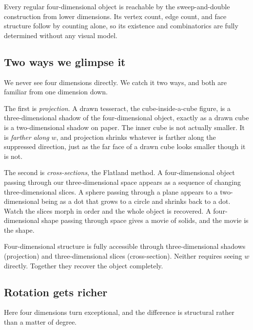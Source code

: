 \begin{proposition}
Every regular four-dimensional object is reachable by the sweep-and-double construction from lower dimensions. Its vertex count, edge count, and face structure follow by counting alone, so its existence and combinatorics are fully determined without any visual model.
\end{proposition}

\subsection{Two ways we glimpse it}

We never see four dimensions directly. We catch it two ways, and both are familiar from one dimension down.

The first is \emph{projection}. A drawn tesseract, the cube-inside-a-cube figure, is a three-dimensional shadow of the four-dimensional object, exactly as a drawn cube is a two-dimensional shadow on paper. The inner cube is not actually smaller. It is \emph{farther along} $w$, and projection shrinks whatever is farther along the suppressed direction, just as the far face of a drawn cube looks smaller though it is not.

The second is \emph{cross-sections}, the Flatland method. A four-dimensional object passing through our three-dimensional space appears as a sequence of changing three-dimensional slices. A sphere passing through a plane appears to a two-dimensional being as a dot that grows to a circle and shrinks back to a dot. Watch the slices morph in order and the whole object is recovered. A four-dimensional shape passing through space gives a movie of solids, and the movie is the shape.

\begin{result}
Four-dimensional structure is fully accessible through three-dimensional shadows (projection) and three-dimensional slices (cross-section). Neither requires seeing $w$ directly. Together they recover the object completely.
\end{result}

\subsection{Rotation gets richer}

Here four dimensions turn exceptional, and the difference is structural rather than a matter of degree.

